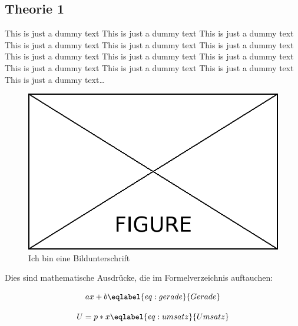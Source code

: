 \subsection{Theorie 1}
\label{sec:theorieA}

This is just a dummy text This is just a dummy text This is just a dummy text This is just a dummy text This is just a dummy text This is just a dummy text This is just a dummy text This is just a dummy text This is just a dummy text This is just a dummy text This is just a dummy text This is just a dummy text This is just a dummy text\dots

\bigskip
\begin{figure}[!h]
	\centering
	\includegraphics[width=\textwidth]{Content/Figures/figure.png}
	\caption{Ich bin eine Bildunterschrift}
	\label{fig:test}
\end{figure}

Dies sind mathematische Ausdrücke, die im Formelverzeichnis auftauchen:

\begin{equation}
ax + b
\eqlabel{eq:gerade}{Gerade}
\end{equation}

\begin{equation}
U = p * x
\eqlabel{eq:umsatz}{Umsatz}
\end{equation}

